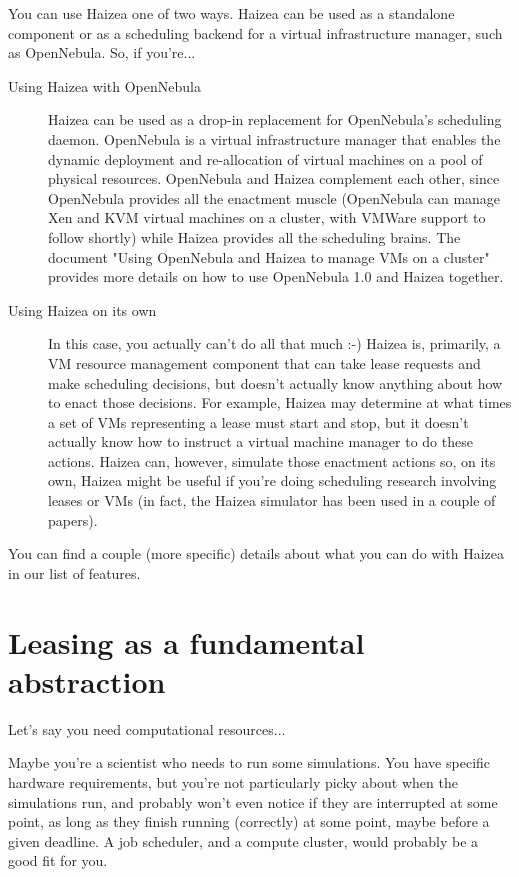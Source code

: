 You can use Haizea one of two ways. Haizea can be used as a standalone component or as a scheduling backend for a virtual infrastructure manager, such as OpenNebula. So, if you're...

\begin{description}
\item[Using Haizea with OpenNebula] Haizea can be used as a drop-in replacement for OpenNebula's scheduling daemon. OpenNebula is a virtual infrastructure manager that enables the dynamic deployment and re-allocation of virtual machines on a pool of physical resources. OpenNebula and Haizea complement each other, since OpenNebula provides all the enactment muscle (OpenNebula can manage Xen and KVM virtual machines on a cluster, with VMWare support to follow shortly) while Haizea provides all the scheduling brains. The document "Using OpenNebula and Haizea to manage VMs on a cluster" provides more details on how to use OpenNebula 1.0 and Haizea together.
\item[Using Haizea on its own] In this case, you actually can't do all that much :-) Haizea is, primarily, a VM resource management component that can take lease requests and make scheduling decisions, but doesn't actually know anything about how to enact those decisions. For example, Haizea may determine at what times a set of VMs representing a lease must start and stop, but it doesn't actually know how to instruct a virtual machine manager to do these actions. Haizea can, however, simulate those enactment actions so, on its own, Haizea might be useful if you're doing scheduling research involving leases or VMs (in fact, the Haizea simulator has been used in a couple of papers).
\end{description}

You can find a couple (more specific) details about what you can do with Haizea in our list of features.

\section{Leasing as a fundamental abstraction}

Let's say you need computational resources...

Maybe you're a scientist who needs to run some simulations. You have specific hardware requirements, but you're not particularly picky about when the simulations run, and probably won't even notice if they are interrupted at some point, as long as they finish running (correctly) at some point, maybe before a given deadline. A job scheduler, and a compute cluster, would probably be a good fit for you.

